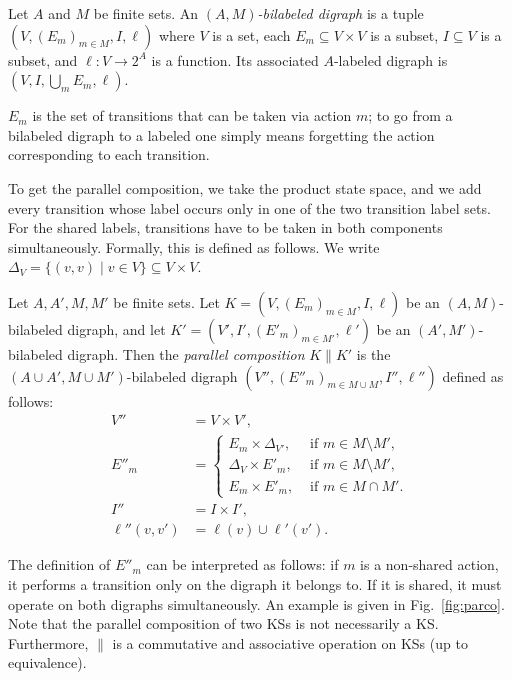 \documentclass[runngingheads]{llncs}
\begin{document}
\begin{definition}
Let $A$ and $M$ be finite sets. An \emph{$(A,M)$-bilabeled digraph} is a tuple $(V,(E_m)_{m \in M},I,\ell)$ where $V$ is a set, each $E_m \subseteq V \times V$ is a subset, $I \subseteq V$ is a subset, and $\ell\colon V \rightarrow 2^A$ is a function. Its associated $A$-labeled digraph is $(V,I,\bigcup_mE_m,\ell)$.
\end{definition}

$E_m$ is the set of transitions that can be taken via action $m$; to go from a bilabeled digraph to a labeled one simply means forgetting the action corresponding to each transition.

To get the parallel composition, we take the product state space, and we add every transition whose label occurs only in one of the two transition label sets. For the shared labels, transitions have to be taken in both components simultaneously. Formally, this is defined as follows. We write $\Delta_V = \{(v,v) \mid v \in V\} \subseteq V \times V$.

\begin{definition} \label{def:parco}
Let $A,A',M,M'$ be finite sets. Let $K = (V,(E_m)_{m\in M},I,\ell)$ be an $(A,M)$-bilabeled digraph, and let $K' = (V',I',(E'_m)_{m \in M'},\ell')$ be an $(A',M')$-bilabeled digraph. Then the \emph{parallel composition} $K \mathbin{\parallel} K'$ is the $(A \cup A',M \cup M')$-bilabeled digraph  $(V'',(E''_m)_{m \in M \cup M},I'',\ell'')$ defined as follows:
\begin{align*}
V'' &= V \times V',\\
E''_m &= \begin{cases}
E_m \times \Delta_{V'}, & \textrm{ if $m \in M \setminus M'$},\\
\Delta_V \times E'_m, & \textrm{ if $m \in M \setminus M'$},\\
E_m \times E'_m, & \textrm{ if $m \in M \cap M'$}.
\end{cases}\\
I'' &= I \times I',\\
\ell''(v,v') &= \ell(v) \cup \ell'(v').
\end{align*}
\end{definition}

The definition of $E''_m$ can be interpreted as follows: if $m$ is a non-shared action, it performs a transition only on the digraph it belongs to. If it is shared, it must operate on both digraphs simultaneously. An example is given in Fig.~\ref{fig:parco}. Note that the parallel composition of two KSs is not necessarily a KS. Furthermore, $\parallel$ is a commutative and associative operation on KSs (up to equivalence).
\end{document}
